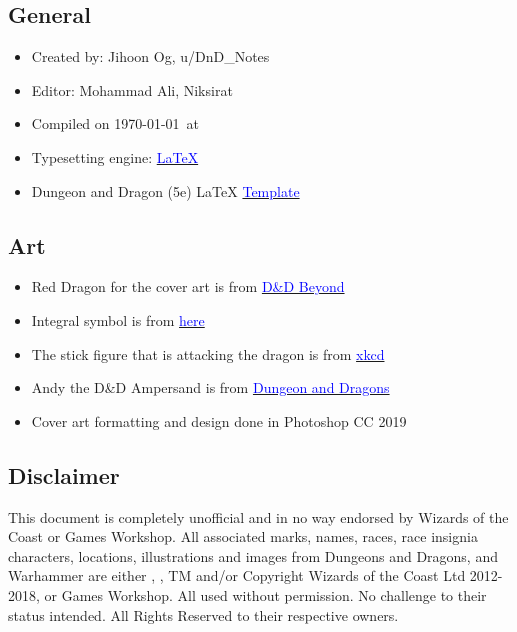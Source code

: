 \documentclass[letterpaper,10pt,twoside,twocolumn,openany]{book}
\begin{document}
\subsection{General}
\begin{itemize}
    \item Created by: Jihoon Og, u/DnD\_Notes
    \item Editor: Mohammad Ali, Niksirat
    \item Compiled on \today\  at \currenttime
    \item Typesetting engine: \href{https://www.latex-project.org/}{\textcolor{blue}{\LaTeX}}
    \item Dungeon and Dragon (5e) LaTeX \href{https://github.com/rpgtex/DND-5e-LaTeX-Template}{\textcolor{blue}{Template}}
\end{itemize}
\subsection{Art}
\begin{itemize}
    \item Red Dragon for the cover art is from \href{https://www.dndbeyond.com/}{\textcolor{blue}{D\&D Beyond}}
    \item Integral symbol is from \href{https://www.kisspng.com/png-integral-symbol-mathematics-calculus-antiderivativ-1116130/preview.html}{\textcolor{blue}{here}}
    \item The stick figure that is attacking the dragon is from \href{https://imgs.xkcd.com/comics/thesis_defense.png}{\textcolor{blue}{xkcd}}
    \item Andy the D\&D Ampersand is from \href{https://www.dnd.wizards.com}{\textcolor{blue}{Dungeon and Dragons}} 
    \item Cover art formatting and design done in Photoshop CC 2019
\end{itemize}

\subsection{Disclaimer}
This document is completely unofficial and in no way endorsed by Wizards of the Coast or Games Workshop. All associated marks, names, races, race insignia characters, locations, illustrations and images from Dungeons and Dragons, and Warhammer are either \textregistered, \textcopyright, TM and/or Copyright Wizards of the Coast Ltd 2012-2018, or Games Workshop. All used without permission. No challenge to their status intended. All Rights Reserved to their respective owners.


% 

\end{document}
